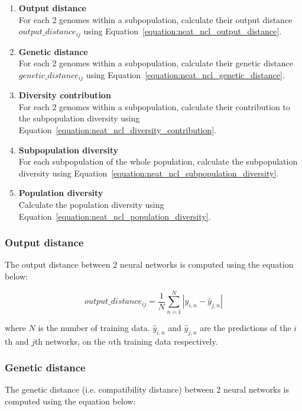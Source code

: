 \documentclass{article}
\begin{document}
\begin{enumerate}
    \item \textbf{Output distance} \\
    For each 2 genomes within a subpopulation, calculate their output distance $output\_distance_{ij}$ using Equation~\ref{equation:neat_ncl_output_distance}. 

    \item \textbf{Genetic distance} \\
    For each 2 genomes within a subpopulation, calculate their genetic distance $genetic\_distance_{ij}$ using Equation~\ref{equation:neat_ncl_genetic_distance}. 

    \item \textbf{Diversity contribution} \\
    For each 2 genomes within a subpopulation, calculate their contribution to the subpopulation diversity using Equation~\ref{equation:neat_ncl_diversity_contribution}. 

    \item \textbf{Subpopulation diversity} \\
    For each subpopulation of the whole population, calculate the subpopulation diversity using Equation~\ref{equation:neat_ncl_subpopulation_diversity}. 

    \item \textbf{Population diversity} \\
    Calculate the population diversity using Equation~\ref{equation:neat_ncl_population_diversity}. 
\end{enumerate}


\subsubsection{Output distance}
The output distance between 2 neural networks is computed using the equation below: 

\begin{equation}
    \label{equation:neat_ncl_output_distance}
    output\_distance_{ij} = \frac{1}{N} \sum_{n = 1}^N \left| \hat{y}_{i,n} - \hat{y}_{j,n} \right|
\end{equation}

where $N$ is the number of training data. $\hat{y}_{i,n}$ and $\hat{y}_{j,n}$ are the predictions of the $i$th and $j$th networks, on the $n$th training data respectively. 


\subsubsection{Genetic distance}
The genetic distance (i.e. compatibility distance) between 2 neural networks is computed using the equation below: 
\end{document}
